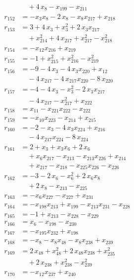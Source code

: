 \begin{align*}
&\quad{}+ 4\,x_{8} - x_{199} - x_{211} \\
r_{152} &= -x_{3} x_{8} - 2\,x_{8} - x_{8} x_{217} + x_{218} \\
r_{153} &= 3 + 4\,x_{3} + x_{3}^{2} + 2\,x_{3} x_{217} \\
&\quad{}+ x_{214}^{2} + 4\,x_{217} + x_{217}^{2} - x_{218}^{2} \\
r_{154} &= -x_{12} x_{216} + x_{219} \\
r_{155} &= -1 + x_{215}^{2} + x_{216}^{2} - x_{219}^{2} \\
r_{156} &= -9 - 4\,x_{3} - 4\,x_{3} x_{220} + x_{12} \\
&\quad{}- 4\,x_{217} - 4\,x_{217} x_{220} - 8\,x_{220} \\
r_{157} &= -4 - 4\,x_{3} - x_{3}^{2} - 2\,x_{3} x_{217} \\
&\quad{}- 4\,x_{217} - x_{217}^{2} + x_{222} \\
r_{158} &= x_{11} - x_{221} x_{222} - x_{222} \\
r_{159} &= -x_{10} x_{223} - x_{214} + x_{215} \\
r_{160} &= -2 - x_{3} - 4\,x_{3} x_{224} + x_{216} \\
&\quad{}- 4\,x_{217} x_{224} - 8\,x_{224} \\
r_{161} &= 2 + x_{3} + x_{3} x_{6} + 2\,x_{6} \\
&\quad{}+ x_{6} x_{217} - x_{213} - x_{213} x_{226} + x_{214} \\
&\quad{}+ x_{217} - x_{218} - x_{225} x_{226} - x_{226} \\
r_{162} &= -3 - 2\,x_{6} - x_{6}^{2} + 2\,x_{6} x_{8} \\
&\quad{}+ 2\,x_{8} - x_{213} - x_{225} \\
r_{163} &= -x_{6} x_{227} - x_{227} + x_{231} \\
r_{164} &= -x_{198} x_{213} + x_{199} - x_{213} x_{231} - x_{228} \\
r_{165} &= -1 + x_{213} - x_{228} - x_{229} \\
r_{166} &= x_{6} - x_{198} - x_{230} \\
r_{167} &= -x_{195} x_{232} + x_{198} \\
r_{168} &= -x_{8} - x_{8} x_{48} - x_{8} x_{238} + x_{239} \\
r_{169} &= 2\,x_{48} + x_{48}^{2} + 2\,x_{48} x_{238} + x_{235}^{2} \\
&\quad{}+ 2\,x_{238} + x_{238}^{2} - x_{239}^{2} \\
r_{170} &= -x_{12} x_{237} + x_{240} \\

\end{align*}
